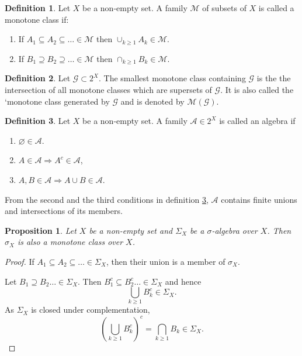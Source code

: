 \documentclass{article}
\theoremstyle{plain}
\numberwithin{thm}{section}
\theoremstyle{plain}
\newtheorem{prop}{Proposition}
\numberwithin{prop}{section}
\theoremstyle{definition}
\newtheorem{defn}{Definition}
\numberwithin{defn}{section}
\theoremstyle{remark}
\theoremstyle{plain}
\numberwithin{cor}{section}
\numberwithin{equation}{section}
\begin{document}
\begin{defn}\label{s6d2}
Let $X$ be a non-empty set. A family $\mathcal{M}$ of subsets of $X$ is called
a monotone class if:
\begin{enumerate}
\item If $A_1 \subseteq A_2 \subseteq \ldots \in \mathcal{M}$ then 
$\cup_{k \ge 1}A_k \in \mathcal{M}$.
\item If $B_1 \supseteq B_2 \supseteq \ldots \in \mathcal{M}$ then 
$\cap_{k \ge 1}B_k \in 
\mathcal{M}$.
\end{enumerate}
\end{defn}

\begin{defn}\label{s6d3}
Let $\mathcal{G} \subset 2^X$. The smallest monotone class containing 
$\mathcal{G}$ is the the intersection of all monotone classes which are supersets
of $\mathcal{G}$. It is also called the `monotone class generated by $\mathcal{G}$
and is denoted by $\mathcal{M}(\mathcal{G})$.
\end{defn}

\begin{defn}\label{s6d4}
Let $X$ be a non-empty set. A family $\mathcal{A} \in 2^X$ is called an algebra
if
\begin{enumerate}
\item $\varnothing \in \mathcal{A}$.
\item $A \in \mathcal{A} \Rightarrow A^c \in \mathcal{A}$,
\item $A, B \in \mathcal{A} \Rightarrow A \cup B \in \mathcal{A}$.
\end{enumerate}
\end{defn}

From the second and the third conditions in definition \ref{s6d4}, $\mathcal{A}$
contains finite unions and intersections of its members.

\begin{prop}\label{s6p3}
Let $X$ be a non-empty set and $\Sigma_X$ be a $\sigma$-algebra over $X$. Then 
$\sigma_X$ is also a monotone class over $X$.
\end{prop}
\begin{proof}
If $A_1 \subseteq A_2 \subseteq \ldots \in \Sigma_X$, then their union is a 
member of $\sigma_X$.

Let $B_1 \supseteq B_2 \ldots \in \Sigma_X$. Then $B_1^c \subseteq B_2^c \ldots 
\in \Sigma_X$ and hence
\[
\bigcup_{k \ge 1}B_k^c \in \Sigma_X.
\]
As $\Sigma_X$ is closed under complementation,
\[
\left(\bigcup_{k \ge 1}B_k^c\right)^c = \bigcap_{k \ge 1} B_k \in \Sigma_X.
\]
\end{proof}
\end{document}
